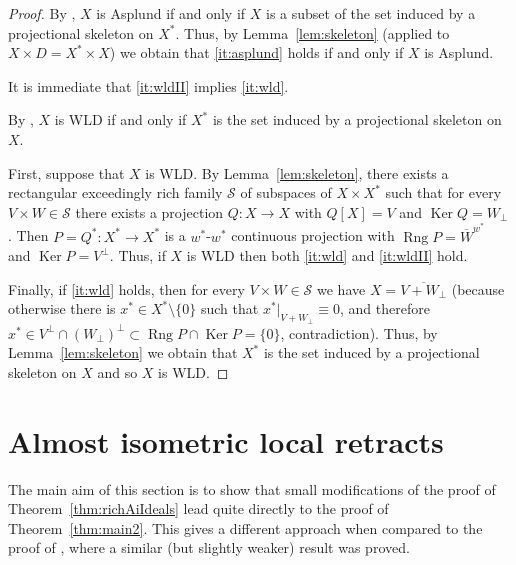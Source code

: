 \documentclass[11pt]{amsart}
\theoremstyle{definition}
\theoremstyle{remark}
\newcommand{\SSS}{\mathcal S}
\def \rng {\operatorname{Rng}}
\def \ker {\operatorname{Ker}}
\begin{document}
\begin{proof}
By \cite[Proposition 26]{KubisSkeleton}, $X$ is Asplund if and only if $X$ is a subset of the set induced by a projectional skeleton on $X^*$. Thus, by Lemma~\ref{lem:skeleton} (applied to $X\times D = X^*\times X$) we obtain that \ref{it:asplund} holds if and only if $X$ is Asplund.

It is immediate that \ref{it:wldII} implies \ref{it:wld}.

By \cite[Corollary 25]{KubisSkeleton}, $X$ is WLD if and only if $X^*$ is the set induced by a projectional skeleton on $X$.

First, suppose that $X$ is WLD. By Lemma~\ref{lem:skeleton}, there exists a rectangular exceedingly rich family $\SSS$ of subspaces of $X\times X^*$ such that for every $V\times W\in \SSS$ there exists a projection $Q:X\to X$ with $Q[X] = V$ and $\ker Q = W_\perp$. Then $P = Q^*:X^*\to X^*$ is a $w^*$-$w^*$ continuous projection with $\rng P = \overline{W}^{w^*}$ and $\ker P = V^\perp$. Thus, if $X$ is WLD then both \ref{it:wld} and \ref{it:wldII} hold.

Finally, if \ref{it:wld} holds, then for every $V\times W\in\SSS$ we have $X = \overline{V + W_\perp}$ (because otherwise there is $x^*\in X^*\setminus\{0\}$ such that $x^*|_{V + W_\perp}\equiv 0$, and therefore $x^*\in V^\perp\cap (W_\perp)^\perp\subset \rng P\cap \ker P = \{0\}$, contradiction). Thus, by Lemma~\ref{lem:skeleton} we obtain that $X^*$ is the set induced by a projectional skeleton on $X$ and so $X$ is WLD.
\end{proof}

\section{Almost isometric local retracts}\label{sec:aiLocRetr}

The main aim of this section is to show that small modifications of the proof of Theorem~\ref{thm:richAiIdeals} lead quite directly to the proof of Theorem~\ref{thm:main2}. This gives a different approach when compared to the proof of \cite[Theorem 5.5]{QuilisZoca}, where a similar (but slightly weaker) result was proved.
\end{document}
